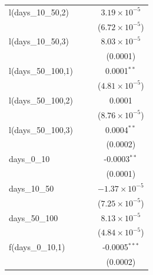\begin{tabular}{lccc}
   l(days\_10\_50,2)                           &          &                        & $3.19\times 10^{-5}$\\    
                                               &          &                        & ($6.72\times 10^{-5}$)\\    
   l(days\_10\_50,3)                           &          &                        & $8.03\times 10^{-5}$\\    
                                               &          &                        & (0.0001)\\   
   l(days\_50\_100,1)                          &          &                        & 0.0001$^{**}$\\   
                                               &          &                        & ($4.81\times 10^{-5}$)\\    
   l(days\_50\_100,2)                          &          &                        & 0.0001\\   
                                               &          &                        & ($8.76\times 10^{-5}$)\\    
   l(days\_50\_100,3)                          &          &                        & 0.0004$^{**}$\\   
                                               &          &                        & (0.0002)\\   
   days\_0\_10                                 &          &                        & -0.0003$^{**}$\\   
                                               &          &                        & (0.0001)\\   
   days\_10\_50                                &          &                        & $-1.37\times 10^{-5}$\\    
                                               &          &                        & ($7.25\times 10^{-5}$)\\    
   days\_50\_100                               &          &                        & $8.13\times 10^{-5}$\\    
                                               &          &                        & ($4.84\times 10^{-5}$)\\    
   f(days\_0\_10,1)                            &          &                        & -0.0005$^{***}$\\   
                                               &          &                        & (0.0002)\\   

\end{tabular}

